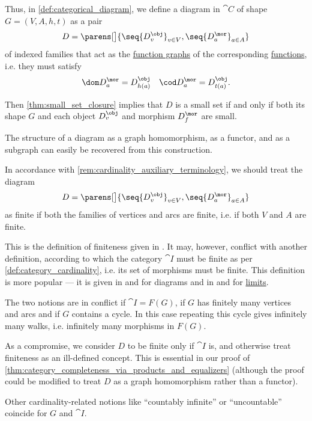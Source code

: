 \begin{remark}
\begin{thmenum}
    Thus, in \cref{def:categorical_diagram}, we define a diagram in \( \cat{C} \) of shape \( G = (V, A, h, t) \) as a pair
    \begin{equation*}
      D = \parens[\big]{ \seq{ D_v^{\obj} }_{v \in V}, \seq{ D_a^{\mor} }_{a \in A} }
    \end{equation*}
    of indexed families that act as the \hyperref[def:set_valued_function/graph]{function graphs} of the corresponding \hyperref[def:function]{functions}, i.e. they must satisfy
    \begin{align*}
      \dom D_a^{\mor} = D_{h(a)}^{\obj} && \cod D_a^{\mor} = D_{t(a)}^{\obj}.
    \end{align*}

    Then \cref{thm:small_set_closure} implies that \( D \) is a small set if and only if both its shape \( G \) and each object \( D_v^{\obj} \) and morphism \( D_f^{\mor} \) are small.

    The structure of a diagram as a graph homomorphism, as a functor, and as a subgraph can easily be recovered from this construction.

     In accordance with \cref{rem:cardinality_auxiliary_terminology}, we should treat the diagram
    \begin{equation*}
      D = \parens[\big]{ \seq{ D_v^{\obj} }_{v \in V}, \seq{ D_a^{\mor} }_{a \in A} }
    \end{equation*}
    as finite if both the families of vertices and arcs are finite, i.e. if both \( V \) and \( A \) are finite.

    This is the definition of finiteness given in \cite[\S 6.1.4]{Schubert1972Categories}. It may, however, conflict with another definition, according to which the category \( \cat{I} \) must be finite as per \cref{def:category_cardinality}, i.e. its set of morphisms must be finite. This definition is more popular --- it is given in
    \cite[def. 11.1(2)]{AdámekHerrlichStrecker2004JoyOfCats} and
    \cite[99]{Riehl2016CategoryTheory}
    for diagrams and in
    \cite[121]{Awodey2010CategoryTheory} and
    \cite[121]{Leinster2014BasicCategoryTheory}
    for \hyperref[def:categorical_limit]{limits}.

    The two notions are in conflict if \( \cat{I} = F(G) \), if \( G \) has finitely many vertices and arcs and if \( G \) contains a cycle. In this case repeating this cycle gives infinitely many walks, i.e. infinitely many morphisms in \( F(G) \).

    As a compromise, we consider \( D \) to be finite only if \( \cat{I} \) is, and otherwise treat finiteness as an ill-defined concept. This is essential in our proof of \cref{thm:category_completeness_via_products_and_equalizers} (although the proof could be modified to treat \( D \) as a graph homomorphism rather than a functor).

    Other cardinality-related notions like \enquote{countably infinite} or \enquote{uncountable} coincide for \( G \) and \( \cat{I} \).
  \end{thmenum}
\end{remark}

